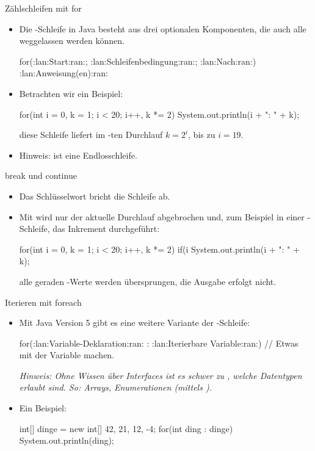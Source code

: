 \begin{frame}[fragile]{Zählschleifen mit for}
    \begin{itemize}[<+(1)->]
        \widei
        \item Die -Schleife in Java besteht aus drei optionalen Komponenten,\pause{} die auch alle weggelassen werden können.
        \begin{plainjava}
for(:lan:Start:ran:; :lan:Schleifenbedingung:ran:; :lan:Nach:ran:) {
    :lan:Anweisung(en):ran:
}
        \end{plainjava}
        \item Betrachten wir ein Beispiel:\pause{}
\begin{plainjava}
for(int i = 0, k = 1; i < 20; i++, k *= 2)
    System.out.println(i + ": " + k);
\end{plainjava}
    \pause{}diese Schleife liefert im -ten Durchlauf \(k = 2^i\),\pause{} bis zu \(i = 19\).
        \item Hinweis:  ist eine Endlosschleife.
    \end{itemize}
\end{frame}

\begin{frame}[fragile]{break und continue}
    \begin{itemize}[<+(1)->]
        \widei
        \item Das Schlüsselwort  bricht die  Schleife ab.
        \item Mit  wird nur der aktuelle Durchlauf abgebrochen und,\pause{} zum Beispiel in einer -Schleife,\pause{} das Inkrement durchgeführt:\pause{}
\begin{plainjava}
for(int i = 0, k = 1; i < 20; i++, k *= 2) {
    if(i %
    System.out.println(i + ": " + k);
}
\end{plainjava}
        \pause{}alle geraden -Werte werden übersprungen, die Ausgabe erfolgt nicht.
    \end{itemize}
\end{frame}

\begin{frame}[fragile]{Iterieren mit foreach}
    \begin{itemize}[<+(1)->]
        \widei
        \item Mit Java Version 5 gibt es eine weitere Variante der -Schleife:\pause{}
\begin{plainjava}
for(:lan:Variable-Deklaration:ran: : :lan:Iterierbare Variable:ran:) {
    // Etwas mit der Variable machen.
}
\end{plainjava}
        \pause{}\textit{Hinweis: Ohne Wissen über Interfaces ist es schwer zu , welche Datentypen erlaubt sind.\pause{} So: Arrays, Enumerationen (mittels ).}
        \item Ein Beispiel:\pause{}
\begin{plainjava}
int[] dinge = new int[] {42, 21, 12, -4};
for(int ding : dinge){
    System.out.println(ding);
}
\end{plainjava}
    \end{itemize}
\end{frame}

